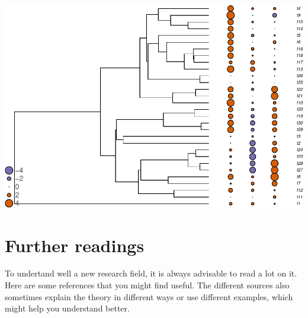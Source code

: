 \documentclass[
]{book}
\begin{document}
\begin{center}\includegraphics{pcm-workshop_files/figure-latex/PlotContinuousParameter_tablephylo4d-1} \end{center}

\chapter{Further readings}\label{further-readings}

To undertand well a new research field, it is always advisable to read a lot on it. Here are some references that you might find useful. The different sources also sometimes explain the theory in different ways or use different examples, which might help you understand better.
\end{document}
